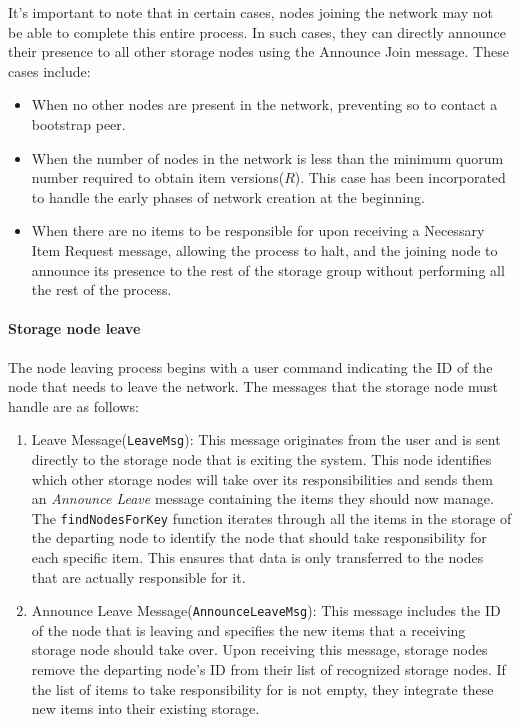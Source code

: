 \documentclass[a4paper, 11pt]{article}
\begin{document}
It's important to note that in certain cases, nodes joining the network may not be able to complete this entire process. In such cases, they can directly announce their presence to all other storage nodes using the Announce Join message. These cases include:

\begin{itemize}
    \item When no other nodes are present in the network, preventing so to contact a bootstrap peer.
    \item When the number of nodes in the network is less than the minimum quorum number required to obtain item versions($R$). This case has been incorporated to handle the early phases of network creation at the beginning.
    \item When there are no items to be responsible for upon receiving a Necessary Item Request message, allowing the process to halt, and the joining node to announce its presence to the rest of the storage group without performing all the rest of the process.
\end{itemize}

\paragraph{Storage node leave} The node leaving process begins with a user command indicating the ID of the node that needs to leave the network. The messages that the storage node must handle are as follows:

\begin{enumerate}
    \item Leave Message(\verb|LeaveMsg|): This message originates from the user and is sent directly to the storage node that is exiting the system. This node identifies which other storage nodes will take over its responsibilities and sends them an \textit{Announce Leave} message containing the items they should now manage. The \verb|findNodesForKey| function iterates through all the items in the storage of the departing node to identify the node that should take responsibility for each specific item. This ensures that data is only transferred to the nodes that are actually responsible for it.
    \item Announce Leave Message(\verb|AnnounceLeaveMsg|): This message includes the ID of the node that is leaving and specifies the new items that a receiving storage node should take over. Upon receiving this message, storage nodes remove the departing node's ID from their list of recognized storage nodes. If the list of items to take responsibility for is not empty, they integrate these new items into their existing storage.
\end{enumerate}
\end{document}
